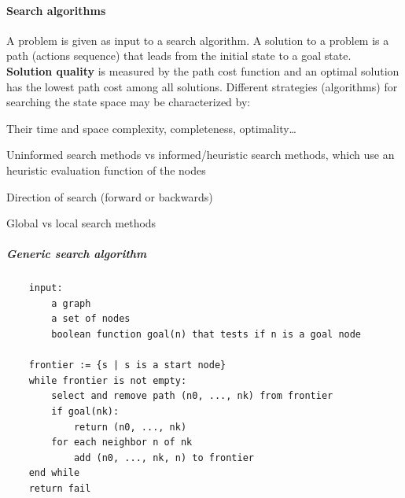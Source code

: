 \documentclass[10pt]{report}
\begin{document}
\paragraph{Search algorithms} A problem is given as input to a search algorithm. A solution to a problem is a path (actions sequence) that leads from the initial state to a goal state.\\
\textbf{Solution quality} is measured by the path cost function and an optimal solution has the lowest path cost among all solutions. Different strategies (algorithms) for searching the state space may be characterized by:
\begin{list}{}{}
	\item Their time and space complexity, completeness, optimality\ldots
	\item Uninformed search methods vs informed/heuristic search methods, which use an heuristic evaluation function of the nodes
	\item Direction of search (forward or backwards)
	\item Global vs local search methods
\end{list}
\subparagraph{Generic search algorithm}
\begin{verbatim}
	input:
		a graph
		a set of nodes
		boolean function goal(n) that tests if n is a goal node
	
	frontier := {s | s is a start node}
	while frontier is not empty:
		select and remove path (n0, ..., nk) from frontier
		if goal(nk):
			return (n0, ..., nk)
		for each neighbor n of nk
			add (n0, ..., nk, n) to frontier
	end while
	return fail
\end{verbatim}
\end{document}
